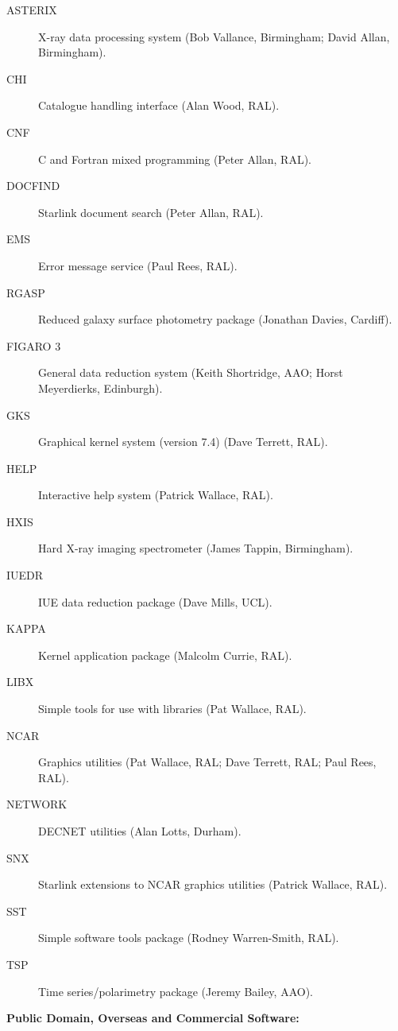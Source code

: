 \begin{description}
\item[ASTERIX] X-ray data processing system (Bob Vallance, Birmingham;
David Allan, Birmingham).
\item[CHI] Catalogue handling interface (Alan Wood, RAL).
\item[CNF] C and Fortran mixed programming (Peter Allan, RAL).
\item[DOCFIND] Starlink document search (Peter Allan, RAL).
\item[EMS] Error message service (Paul Rees, RAL).
\item[RGASP] Reduced galaxy surface photometry package (Jonathan Davies,
Cardiff).
\item[FIGARO 3] General data reduction system (Keith Shortridge, AAO; Horst
Meyerdierks, Edinburgh).
\item[GKS] Graphical kernel system (version 7.4) (Dave Terrett, RAL).
\item[HELP] Interactive help system (Patrick Wallace, RAL).
\item[HXIS] Hard X-ray imaging spectrometer (James Tappin, Birmingham).
\item[IUEDR] IUE data reduction package (Dave Mills, UCL).
\item[KAPPA] Kernel application package (Malcolm Currie, RAL).
\item[LIBX] Simple tools for use with libraries (Pat Wallace, RAL).
\item[NCAR] Graphics utilities (Pat Wallace, RAL; Dave Terrett, RAL;
Paul Rees, RAL).
\item[NETWORK] DECNET utilities (Alan Lotts, Durham).
\item[SNX] Starlink extensions to NCAR graphics utilities (Patrick Wallace,
RAL).
\item[SST] Simple software tools package (Rodney Warren-Smith, RAL).
\item[TSP] Time series/polarimetry package (Jeremy Bailey, AAO).
\end{description}


\vspace{5mm}
\begin{center}
{\bf Public Domain, Overseas and Commercial Software:}
\end{center}

